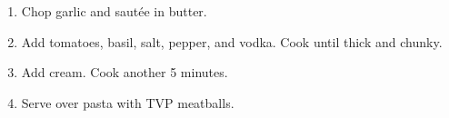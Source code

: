 
\begin{ingredients}
\end{ingredients}


\begin{recipe}
  \begin{enumerate}

  \item Chop garlic and saut\'ee in butter.

  \item Add tomatoes, basil, salt, pepper, and vodka.  Cook until thick and chunky.

  \item Add cream.  Cook another 5 minutes.

  \item Serve over pasta with TVP meatballs.

  \end{enumerate}
\end{recipe}
